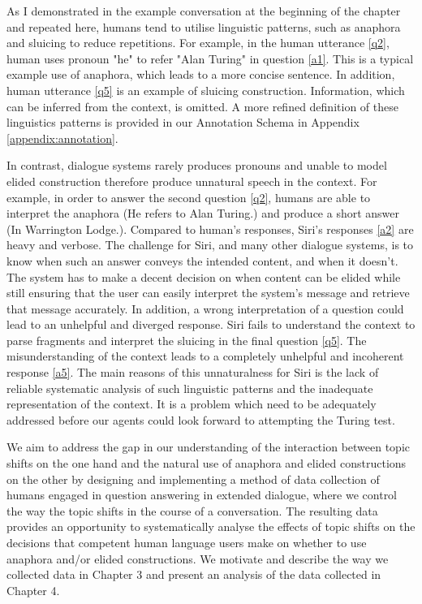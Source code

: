 \documentclass[bsc,frontabs,twoside,singlespacing,parskip,deptreport]{infthesis}     %
\begin{document}
As I demonstrated in the example conversation at the beginning of the chapter and repeated here, humans tend to utilise linguistic patterns, such as anaphora and sluicing to reduce repetitions. For example, in the human utterance \ref{q2}, human uses pronoun "he" to refer "Alan Turing" in question \ref{a1}. This is a typical example use of anaphora, which leads to a more concise sentence. In addition, human utterance \ref{q5} is an example of sluicing construction. Information, which can be inferred from the context, is omitted. A more refined definition of these linguistics patterns is provided in our Annotation Schema in Appendix \ref{appendix:annotation}.

In contrast, dialogue systems rarely produces pronouns and unable to model elided construction therefore produce unnatural speech in the context. For example, in order to answer the second question \ref{q2}, humans are able to interpret the anaphora (He refers to Alan Turing.) and produce a short answer (In Warrington Lodge.). Compared to human's responses, Siri's responses \ref{a2} are heavy and verbose. The challenge for Siri, and many other dialogue systems, is to know when such an answer conveys the intended content, and when it doesn't. The system has to make a decent decision on when content can be elided while still ensuring that the user can easily interpret the system's message and retrieve that message accurately. In addition, a wrong interpretation of a question could lead to an unhelpful and diverged response. Siri fails to understand the context to parse fragments and interpret the sluicing in the final question \ref{q5}. The misunderstanding of the context leads to a completely unhelpful and incoherent response \ref{a5}. The main reasons of this unnaturalness for Siri is the lack of reliable systematic analysis of such linguistic patterns and the inadequate representation of the context. It is a problem which need to be adequately addressed before our agents could look forward to attempting the Turing test.

We aim to address the gap in our understanding of the interaction between topic shifts on the one hand and the natural use of anaphora and elided constructions on the other by designing and implementing a method of data collection of humans engaged in question answering in extended dialogue, where we control the way the topic shifts in the course of a conversation. The resulting data provides an opportunity to systematically analyse the effects of topic shifts on the decisions that competent human language users make on whether to use anaphora and/or elided constructions. We motivate and describe the way we collected data in Chapter 3 and present an analysis of the data collected in Chapter 4.
\end{document}
